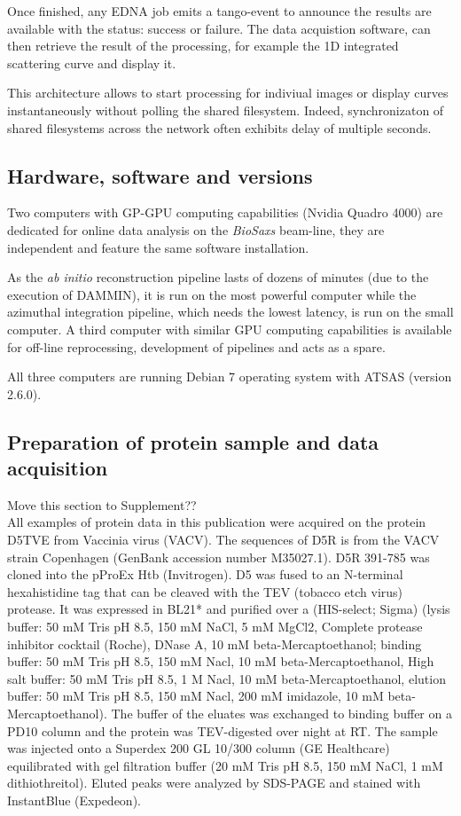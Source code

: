 \documentclass[preprint,pdf]{iucr}              %
\begin{document}
Once finished, any EDNA job emits a tango-event to announce the results are
available with the status: success or failure. 
The data acquistion software, can then retrieve the result
of the processing, for example the 1D integrated scattering curve and
display it.

This architecture allows to start processing for indiviual images or
display curves instantaneously without polling the shared filesystem.
Indeed, synchronizaton of shared filesystems across the network
often exhibits delay of multiple seconds. 

\subsection{Hardware, software and versions}
Two computers with GP-GPU computing capabilities (Nvidia Quadro 4000) are
dedicated for online data analysis on the \textit{BioSaxs} beam-line, they are
independent and feature the same software installation.

As the \textit{ab initio} reconstruction pipeline lasts of dozens of minutes
(due to the execution of DAMMIN), it is run on the most powerful computer while 
the azimuthal integration pipeline, which needs the lowest latency, is run on
the small computer. 
A third computer with similar GPU computing capabilities is available for
off-line reprocessing, development of pipelines and acts as a spare. 

All three computers are running Debian 7 operating system with ATSAS
(version 2.6.0).


\subsection{Preparation of protein sample and data acquisition}
 Move this section to Supplement??\\
All examples of protein data in this publication were acquired on the protein D5TVE from Vaccinia virus (VACV).
The sequences of D5R is from the VACV strain Copenhagen (GenBank accession number M35027.1). D5R 391-785 was cloned into the pProEx Htb (Invitrogen). D5 was fused to an N-terminal hexahistidine tag that can be cleaved with the TEV (tobacco etch virus) protease. It was expressed in BL21* and purified over a (HIS-select; Sigma) (lysis buffer: 50 mM Tris pH 8.5, 150 mM NaCl, 5 mM MgCl2, Complete protease inhibitor cocktail (Roche), DNase A, 10 mM beta-Mercaptoethanol; binding buffer: 50 mM Tris pH 8.5, 150 mM Nacl, 10 mM beta-Mercaptoethanol, High salt buffer: 50 mM Tris pH 8.5, 1 M Nacl, 10 mM beta-Mercaptoethanol, elution buffer: 50 mM Tris pH 8.5, 150 mM Nacl,  200 mM imidazole, 10 mM beta-Mercaptoethanol). The buffer of the eluates was exchanged to binding buffer on a PD10 column and the protein was TEV-digested over night at RT. The sample was injected onto a Superdex 200 GL 10/300 column (GE Healthcare) equilibrated with gel filtration buffer (20 mM Tris pH 8.5, 150 mM NaCl, 1 mM dithiothreitol). Eluted peaks were analyzed by SDS-PAGE and stained with InstantBlue (Expedeon). 
\end{document}
